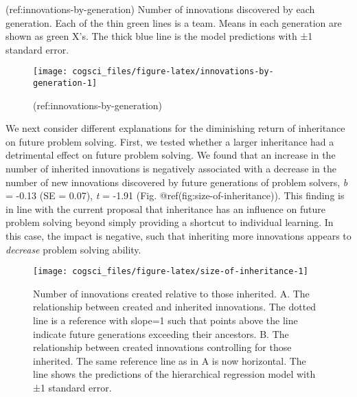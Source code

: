 \documentclass[10pt, letterpaper]{article}
\newenvironment{CodeChunk}{}{}
\begin{document}
(ref:innovations-by-generation) Number of innovations discovered by each
generation. Each of the thin green lines is a team. Means in each
generation are shown as green X's. The thick blue line is the model
predictions with ±1 standard error.

\begin{CodeChunk}
\begin{figure}[tb]
\texttt{[image: cogsci\_files/figure-latex/innovations-by-generation-1]} \caption[(ref:innovations-by-generation)]{(ref:innovations-by-generation)}\label{fig:innovations-by-generation}
\end{figure}
\end{CodeChunk}

We next consider different explanations for the diminishing return of
inheritance on future problem solving. First, we tested whether a larger
inheritance had a detrimental effect on future problem solving. We found
that an increase in the number of inherited innovations is negatively
associated with a decrease in the number of new innovations discovered
by future generations of problem solvers, \emph{b} = -0.13 (SE = 0.07),
\emph{t} = -1.91 (Fig. @ref(fig:size-of-inheritance)). This finding is
in line with the current proposal that inheritance has an influence on
future problem solving beyond simply providing a shortcut to individual
learning. In this case, the impact is negative, such that inheriting
more innovations appears to \emph{decrease} problem solving ability.

\begin{CodeChunk}
\begin{figure*}[tb]
\texttt{[image: cogsci\_files/figure-latex/size-of-inheritance-1]} \caption[Number of innovations created relative to those inherited]{Number of innovations created relative to those inherited. A. The relationship between created and inherited innovations. The dotted line is a reference with slope=1 such that points above the line indicate future generations exceeding their ancestors. B. The relationship between created innovations controlling for those inherited. The same reference line as in A is now horizontal. The line shows the predictions of the hierarchical regression model with ±1 standard error.}\label{fig:size-of-inheritance}
\end{figure*}
\end{CodeChunk}
\end{document}

